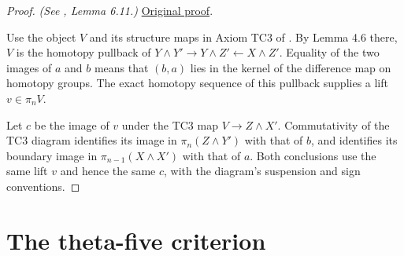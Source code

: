 \begin{proof}
\textit{(See \cite{LWX126}, Lemma 6.11.)} \href{paper/main.tex.html#L1769}{Original proof}.

Use the object $V$ and its structure maps in Axiom TC3 of \cite{May01}. By Lemma 4.6 there, $V$ is the homotopy pullback of $Y\wedge Y'\to Y\wedge Z'\leftarrow X\wedge Z'$. Equality of the two images of $a$ and $b$ means that $(b,a)$ lies in the kernel of the difference map on homotopy groups. The exact homotopy sequence of this pullback supplies a lift $v\in\pi_nV$.

Let $c$ be the image of $v$ under the TC3 map $V\to Z\wedge X'$. Commutativity of the TC3 diagram identifies its image in $\pi_n(Z\wedge Y')$ with that of $b$, and identifies its boundary image in $\pi_{n-1}(X\wedge X')$ with that of $a$. Both conclusions use the same lift $v$ and hence the same $c$, with the diagram's suspension and sign conventions.
\end{proof}

\section{The theta-five criterion}

